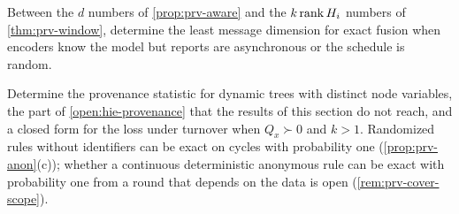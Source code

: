 \begin{openproblem}\label{open:prv-aware}
Between the $d$ numbers of \cref{prop:prv-aware} and the $k\operatorname{rank} H_i$ numbers of \cref{thm:prv-window}, determine the least message dimension for exact fusion when encoders know the model but reports are asynchronous or the schedule is random.
\end{openproblem}

\begin{openproblem}\label{open:prv-hierarchy}
Determine the provenance statistic for dynamic trees with distinct node variables, the part of \cref{open:hie-provenance} that the results of this section do not reach, and a closed form for the loss under turnover when $Q_x\succ0$ and $k>1$. Randomized rules without identifiers can be exact on cycles with probability one (\cref{prop:prv-anon}(c)); whether a continuous deterministic anonymous rule can be exact with probability one from a round that depends on the data is open (\cref{rem:prv-cover-scope}).
\end{openproblem}

